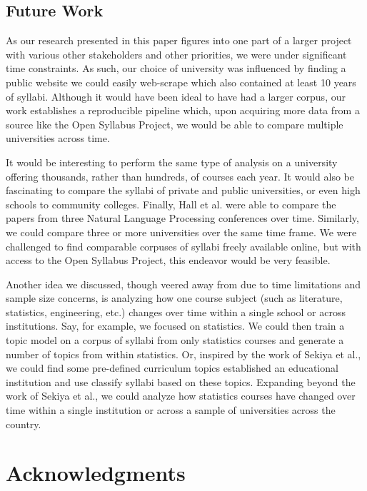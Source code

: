 \documentclass[fleqn,10pt]{JLA_article} %
\begin{document}
\subsection{Future Work} 

As our research presented in this paper figures into one part of a larger project with various other stakeholders and other priorities, we were under significant time constraints. As such, our choice of university was influenced by finding a public website we could easily web-scrape which also contained at least 10 years of syllabi. Although it would have been ideal to have had a larger corpus, our work establishes a reproducible pipeline which, upon acquiring more data from a source like the Open Syllabus Project, we would be able to compare multiple universities across time. 

It would be interesting to perform the same type of analysis on a university offering thousands, rather than hundreds, of courses each year. It would also be fascinating to compare the syllabi of private and public universities, or even high schools to community colleges. Finally, Hall et al. were able to compare the papers from three Natural Language Processing conferences over time. Similarly, we could compare three or more universities over the same time frame. We were challenged to find comparable corpuses of syllabi freely available online, but with access to the Open Syllabus Project, this endeavor would be very feasible.

Another idea we discussed, though veered away from due to time limitations and sample size concerns, is analyzing how one course subject (such as literature, statistics, engineering, etc.) changes over time within a single school or across institutions. Say, for example, we focused on statistics. We could then train a topic model on a corpus of syllabi from only statistics courses and generate a number of topics from within statistics. Or, inspired by the work of Sekiya et al., we could find some pre-defined curriculum topics established an educational institution and use classify syllabi based on these topics. Expanding beyond the work of Sekiya et al., we could analyze how statistics courses have changed over time within a single institution or across a sample of universities across the country. 

\section*{Acknowledgments} %
\end{document}
